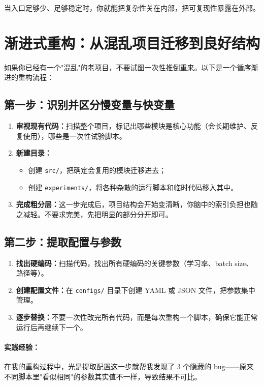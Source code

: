 当入口足够少、足够稳定时，你就能把复杂性关在内部，把可复现性暴露在外部。

\section{渐进式重构：从混乱项目迁移到良好结构}

如果你已经有一个"混乱"的老项目，不要试图一次性推倒重来。以下是一个循序渐进的重构流程：

\subsection{第一步：识别并区分慢变量与快变量}

\begin{enumerate}
  \item \textbf{审视现有代码：}扫描整个项目，标记出哪些模块是核心功能（会长期维护、反复使用），哪些是一次性试验脚本。

  \item \textbf{新建目录：}
  \begin{itemize}
    \item 创建 \texttt{src/}，把确定会复用的模块迁移进去；
    \item 创建 \texttt{experiments/}，将各种杂散的运行脚本和临时代码移入其中。
  \end{itemize}

  \item \textbf{完成粗分层：}这一步完成后，项目结构会开始变清晰，你脑中的索引负担也随之减轻。不要求完美，先把明显的部分分开即可。
\end{enumerate}

\subsection{第二步：提取配置与参数}

\begin{enumerate}
  \item \textbf{找出硬编码：}扫描代码，找出所有硬编码的关键参数（学习率、batch size、路径等）。

  \item \textbf{创建配置文件：}在 \texttt{configs/} 目录下创建 YAML 或 JSON 文件，把参数集中管理。

  \item \textbf{逐步替换：}不要一次性改完所有代码，而是每次重构一个脚本，确保它能正常运行后再继续下一个。
\end{enumerate}

\paragraph{实践经验：}在我的重构过程中，光是提取配置这一步就帮我发现了 3 个隐藏的 bug——原来不同脚本里"看似相同"的参数其实值不一样，导致结果不可比。

